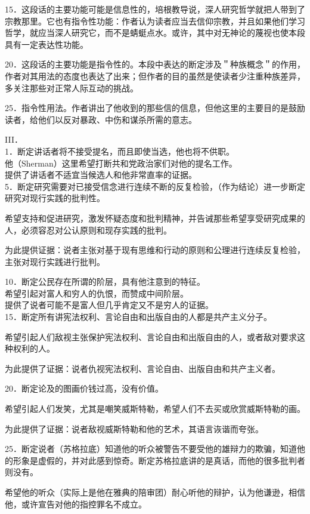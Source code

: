 15．这段话的主要功能可能是信息性的，培根教导说，深人研究哲学就把人带到了宗教那里。它也有指令性功能：作者认为读者应当去信仰宗教，并且如果他们学习哲学，就应当深人研究它，而不是蜻蜓点水。或许，其中对无神论的蔑视也使本段具有一定表达性功能。

20．这段话的主要功能是指令性的。本段中表达的断定涉及＂种族概念＂的作用，作者对其用法的态度也表达了出来；但作者的目的虽然是使读者少注重种族差异，多关注那些对正常人际互动的挑战。

25．指令性用法。作者讲出了他收到的那些信的信息，但他这里的主要目的是鼓励读者，给他们以反对暴政、中伤和谋杀所需的意志。

III．\\
1．断定讲话者将不接受提名，而且即使当选，他也将不供职。\\
他（Sherman）这里希望打断共和党政治家们对他的提名工作。\\
提供了讲话者不适宜当候选人和他非常直率的证据。\\
5．断定研究需要对已接受信念进行连续不断的反复检验，（作为结论）进一步断定研究对现行实践的批判性。

希望支持和促进研究，激发怀疑态度和批判精神，并告诫那些希望享受研究成果的人，必须容忍对公认原则和现存实践的批判。

为此提供证据：说者主张对基于现有思维和行动的原则和公理进行连续反复检验，主张对现行实践进行批判。

10．断定公民存在所谓的阶层，具有他注意到的特征。\\
希望引起对富人和穷人的仇恨，而赞成中间阶层。\\
提供了说者可能不是富人但几乎肯定又不是穷人的证据。\\
15．断定所有讲宪法权利、言论自由和出版自由的人都是共产主义分子。

希望引起人们敌视主张保护宪法权利、言论自由和出版自由的人，或者敌对要求这种权利的人。

为此提供了证据：说者仇视宪法权利、言论自由、出版自由和共产主义者。

20．断定论及的图画价钱过高，没有价值。

希望引起人们发笑，尤其是嘲笑威斯特勒，希望人们不去买或欣赏威斯特勒的画。

为此提供了证据：说者敌视威斯特勒和他的艺术，其语言诙谐而夸张。

25．断定说者（苏格拉底）知道他的听众被警告不要受他的雄辩力的欺骗，知道他的形象是虚假的，并对此感到惊奇。断定苏格拉底讲的是真话，而他的很多批判者则没有。

希望他的听众（实际上是他在雅典的陪审团）耐心听他的辩护，认为他谦逊，相信他，或许宣告对他的指控罪名不成立。

